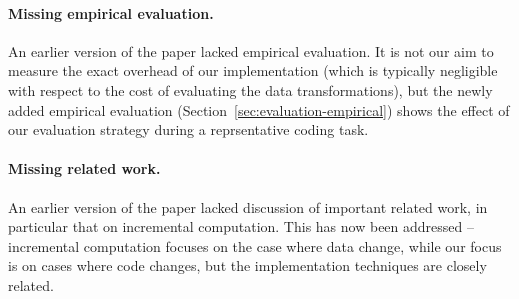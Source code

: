 \documentclass[english,submission]{programming}
\theoremstyle{plain}
\theoremstyle{definition}
\begin{document}
\paragraph{Missing empirical evaluation.}
An earlier version of the paper lacked empirical evaluation. It is not our aim to measure
the exact overhead of our implementation (which is typically negligible with respect to the
cost of evaluating the data transformations), but the newly added empirical evaluation
(Section~\ref{sec:evaluation-empirical}) shows the effect of our evaluation strategy during
a reprsentative coding task.

\paragraph{Missing related work.}
An earlier version of the paper lacked discussion of important related work, in particular that
on incremental computation. This has now been addressed -- incremental computation focuses on
the case where data change, while our focus is on cases where code changes, but the implementation
techniques are closely related.
\end{document}
